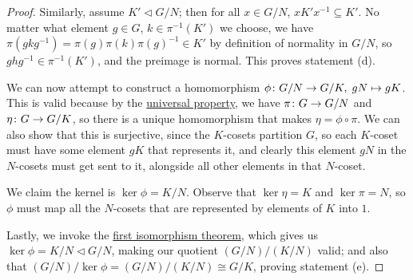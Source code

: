 \begin{proof}
    \medskip

    Similarly, assume \(K' \lhd G/N\);
    then for all \(x \in G/N\), \(xK'x^{-1} \subseteq K'\).
    No matter what element \(g \in G\), \(k \in \pi^{-1}(K')\) we choose,
    we have \(\pi(gkg^{-1}) = \pi(g)\pi(k){\pi(g)}^{-1} \in K'\)
    by definition of normality in \(G/N\),
    so \(ghg^{-1} \in \pi^{-1}(K')\),
    and the preimage is normal.
    This proves statement (d).

    \medskip
    
    We can now attempt to construct a homomorphism
    \(\phi\colon G/N\to G/K,\;gN\mapsto gK\).
    This is valid because
    by the \hyperref[thm:univ-prop-quotient-group]{universal property},
    we have \(\pi\colon G\to G/N\) and \(\eta\colon G\to G/K\),
    so there is a unique homomorphism that makes \(\eta = \phi\circ\pi\).
    We can also show that this is surjective,
    since the \(K\)-cosets partition \(G\),
    so each \(K\)-coset must have some element \(gK\)
    that represents it,
    and clearly this element \(gN\) in the \(N\)-cosets
    must get sent to it,
    alongside all other elements in that \(N\)-coset.

    We claim the kernel is \(\ker\phi = K/N\).
    Observe that \(\ker\eta = K\) and \(\ker\pi = N\),
    so \(\phi\) must map all the \(N\)-cosets
    that are represented by elements of \(K\) into \(1\).

    Lastly, we invoke the \hyperref[thm:iso-1-group]{first isomorphism theorem},
    which gives us \(\ker\phi = K/N \lhd G/N\),
    making our quotient \((G/N)/(K/N)\) valid;
    and also that \((G/N)/\ker\phi = (G/N)/(K/N) \cong G/K\),
    proving statement (e).
\end{proof}

